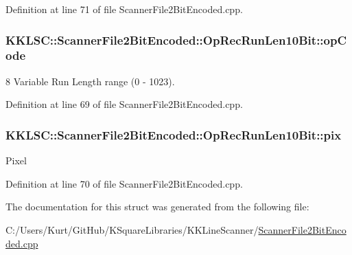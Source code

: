 Definition at line 71 of file Scanner\+File2\+Bit\+Encoded.\+cpp.

\subsubsection[{\texorpdfstring{op\+Code}{opCode}}]{ K\+K\+L\+S\+C\+::\+Scanner\+File2\+Bit\+Encoded\+::\+Op\+Rec\+Run\+Len10\+Bit\+::op\+Code}\hypertarget{struct_scanner_file2_bit_encoded_1_1_op_rec_run_len10_bit_add92a54ef6b74294ef0c10e0c7f1c519}{}\label{struct_scanner_file2_bit_encoded_1_1_op_rec_run_len10_bit_add92a54ef6b74294ef0c10e0c7f1c519}
8 Variable Run Length range (0 -\/ 1023). 

Definition at line 69 of file Scanner\+File2\+Bit\+Encoded.\+cpp.

\subsubsection[{\texorpdfstring{pix}{pix}}]{ K\+K\+L\+S\+C\+::\+Scanner\+File2\+Bit\+Encoded\+::\+Op\+Rec\+Run\+Len10\+Bit\+::pix}\hypertarget{struct_scanner_file2_bit_encoded_1_1_op_rec_run_len10_bit_a4028ae8b94fd3e238358130131e0b428}{}\label{struct_scanner_file2_bit_encoded_1_1_op_rec_run_len10_bit_a4028ae8b94fd3e238358130131e0b428}
Pixel 

Definition at line 70 of file Scanner\+File2\+Bit\+Encoded.\+cpp.



The documentation for this struct was generated from the following file\+:\begin{DoxyCompactItemize}
\item 
C\+:/\+Users/\+Kurt/\+Git\+Hub/\+K\+Square\+Libraries/\+K\+K\+Line\+Scanner/\hyperlink{_scanner_file2_bit_encoded_8cpp}{Scanner\+File2\+Bit\+Encoded.\+cpp}\end{DoxyCompactItemize}

